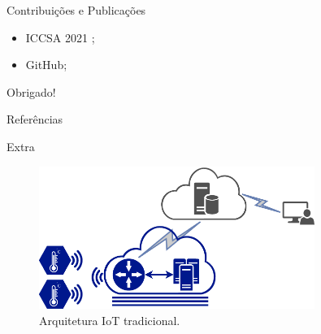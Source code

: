 \documentclass[aspectratio=1610,10pt]{beamer}
\begin{document}
\begin{frame}{Contribuições e Publicações}
  \begin{itemize}
    \item ICCSA 2021 \cite{Puhl2021};
    \item GitHub;
  \end{itemize}
\end{frame}

{\begin{frame}[standout]
  Obrigado!
\end{frame}}

\begin{frame}[allowframebreaks]{Referências}
  
\end{frame}

\appendix

\begin{frame}[fragile]{Extra}
  \begin{figure}[ht]
    \centering
    \includegraphics[width=0.8\textwidth]{figures/mfog-arch-fisica.svg.pdf}
    \caption{Arquitetura IoT tradicional.}
    \label{fig:ids-iot-phy}
  \end{figure}
\end{frame}
\end{document}
